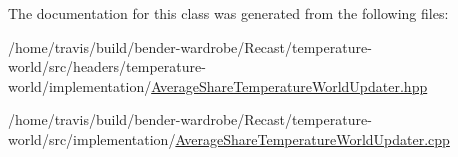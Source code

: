 The documentation for this class was generated from the following files\-:\begin{DoxyCompactItemize}
\item 
/home/travis/build/bender-\/wardrobe/\-Recast/temperature-\/world/src/headers/temperature-\/world/implementation/\hyperlink{_average_share_temperature_world_updater_8hpp}{Average\-Share\-Temperature\-World\-Updater.\-hpp}\item 
/home/travis/build/bender-\/wardrobe/\-Recast/temperature-\/world/src/implementation/\hyperlink{_average_share_temperature_world_updater_8cpp}{Average\-Share\-Temperature\-World\-Updater.\-cpp}\end{DoxyCompactItemize}

